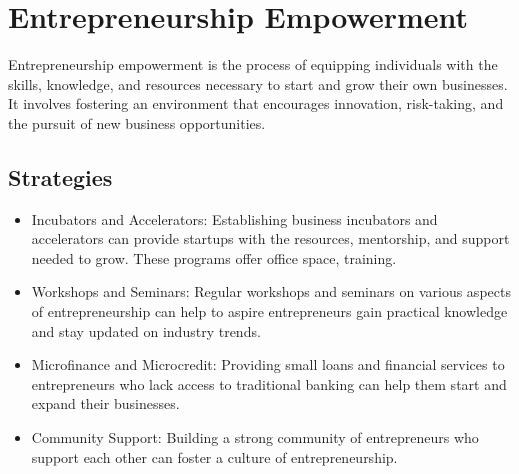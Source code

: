 \section{Entrepreneurship Empowerment}
Entrepreneurship empowerment is the process of equipping individuals with the skills, knowledge, and resources necessary to start and grow their own businesses. It involves fostering an environment that encourages innovation, risk-taking, and the pursuit of new business opportunities. 
\subsection {Strategies}
    \begin{itemize}
        \item Incubators and Accelerators: Establishing business incubators and accelerators can provide startups with the resources, mentorship, and support needed to grow. These programs offer office space, training.

        \item Workshops and Seminars: Regular workshops and seminars on various aspects of entrepreneurship can help to aspire entrepreneurs gain practical knowledge and stay updated on industry trends.

        \item Microfinance and Microcredit: Providing small loans and financial services to entrepreneurs who lack access to traditional banking can help them start and expand their businesses.

        \item Community Support: Building a strong community of entrepreneurs who support each other can foster a culture of entrepreneurship.
    \end{itemize}
